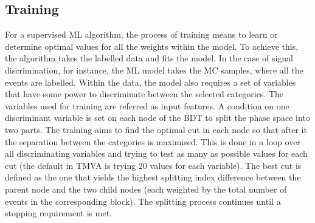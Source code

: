 \subsection{Training}
For a supervised ML algorithm, the process of training means to learn or determine optimal values for all the weights within the model. 
To achieve this, the algorithm takes the labelled data and fits the model. In the case of signal discrimination, for instance,
the ML model takes the MC samples, where all the events are labelled. %
Within the data, the model also requires 
a set of variables that have some power to discriminate between the selected categories. 
The variables used for training are referred as input features. 
A condition on one discriminant variable
is set on each node of the BDT to split the phase space into two parts.
The training aims to find the optimal cut in each node so that after it
the separation between the categories is maximised. %
This is done in a loop over all discriminating variables and trying to test as many as possible values for each cut 
(the default in TMVA is trying 20 values for each variable). %
The best cut is defined as the one that yields the highest splitting index difference between the parent node
and the two child nodes (each weighted by the total number of events in the corresponding block). 
The splitting process continues until a stopping requirement is met.




